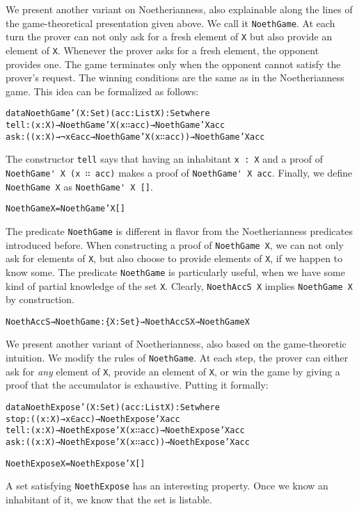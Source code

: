 \documentclass{eptcs}
\begin{document}
We present another variant on Noetherianness, also explainable along the lines of the
game-theoretical presentation given above. We call it \verb;NoethGame;. At each
turn the prover can not only ask for a fresh element of \verb;X; but also
provide an element of \verb;X;. Whenever the prover asks for a fresh element,
the opponent provides one. The game terminates only when the opponent cannot
satisfy the prover's request. The winning conditions are the same as in the
Noetherianness game. This idea can be formalized as follows:
\begin{alltt}
data NoethGame' (X : Set) (acc : List X) : Set where
  tell : (x : X) → NoethGame' X (x ∷ acc) → NoethGame' X acc
  ask  : ((x : X) → ¬ x ∈ acc → NoethGame' X (x ∷ acc)) → NoethGame' X acc
\end{alltt}
The constructor \verb;tell; says that having an inhabitant \verb;x : X; and a
proof of \verb;NoethGame' X (x ∷ acc); makes a proof of
\verb;NoethGame' X acc;. Finally, we define \verb;NoethGame X; as
\verb;NoethGame' X [];.
\begin{alltt}
NoethGame X = NoethGame' X []
\end{alltt}
The predicate \verb;NoethGame; is different in flavor from the Noetherianness
predicates introduced before. When constructing a proof of \verb;NoethGame X;, we
can not only ask for elements of \verb;X;, but also choose to provide elements of
\verb;X;, if we happen to know some.  The predicate \verb;NoethGame; is
particularly useful, when we have some kind of partial knowledge of the set
\verb;X;. Clearly, \verb;NoethAccS X; implies \verb;NoethGame X; by
construction.
\begin{alltt}
NoethAccS→NoethGame : \{X : Set\} → NoethAccS X → NoethGame X
\end{alltt}

We present another variant of Noetherianness, also based on the game-theoretic
intuition. We modify the rules of \verb;NoethGame;. At each step, the prover can
either ask for \emph{any} element of \verb;X;, provide an element of \verb;X;,
or win the game by giving a proof that the accumulator is exhaustive. Putting it
formally:
\begin{alltt} 
data NoethExpose' (X : Set) (acc : List X) : Set where
  stop : ((x : X) → x ∈ acc) → NoethExpose' X acc
  tell : (x : X) → NoethExpose' X (x ∷ acc) → NoethExpose' X acc
  ask  : ((x : X) → NoethExpose' X (x ∷ acc)) → NoethExpose' X acc

NoethExpose X = NoethExpose' X []
\end{alltt}
A set satisfying \verb;NoethExpose; has an interesting property. Once we know
an inhabitant of it, we know that the set is listable.
\end{document}
